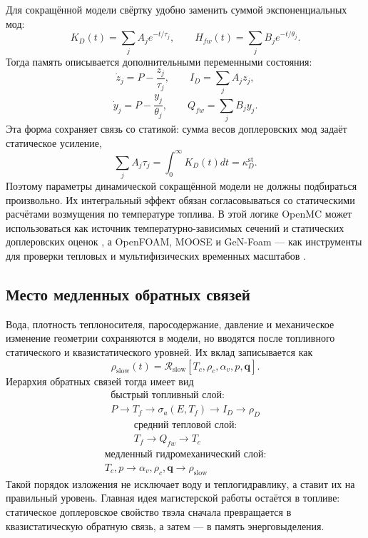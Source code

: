 \documentclass[12pt]{article}
\begin{document}
Для сокращённой модели свёртку удобно заменить суммой экспоненциальных мод:
\[
K_D(t)=\sum_jA_je^{-t/\tau_j},
\qquad
H_{fw}(t)=\sum_jB_je^{-t/\theta_j}.
\]
Тогда память описывается дополнительными переменными состояния:
\[
\dot z_j=P-\frac{z_j}{\tau_j},
\qquad
I_D=\sum_jA_jz_j,
\]
\[
\dot y_j=P-\frac{y_j}{\theta_j},
\qquad
Q_{fw}=\sum_jB_jy_j.
\]
Эта форма сохраняет связь со статикой: сумма весов доплеровских мод задаёт статическое усиление,
\[
\sum_jA_j\tau_j
=
\int_0^\infty K_D(t)dt
=
\kappa_D^{\mathrm{st}}.
\]
Поэтому параметры динамической сокращённой модели не должны подбираться произвольно. Их интегральный эффект обязан согласовываться со статическими расчётами возмущения по температуре топлива. В этой логике OpenMC может использоваться как источник температурно-зависимых сечений и статических доплеровских оценок \cite{OpenMCCrossSections}, а OpenFOAM, MOOSE и GeN-Foam --- как инструменты для проверки тепловых и мультифизических временных масштабов \cite{MOOSEHeatTransfer,OpenFOAMSolvers,GeNFoam2015}.

\subsection{Место медленных обратных связей}

Вода, плотность теплоносителя, паросодержание, давление и механическое изменение геометрии сохраняются в модели, но вводятся после топливного статического и квазистатического уровней. Их вклад записывается как
\[
\rho_{\mathrm{slow}}(t)
=
\mathcal R_{\mathrm{slow}}
[T_c,\rho_c,\alpha_v,p,\mathbf q].
\]
Иерархия обратных связей тогда имеет вид
\[
\boxed{
\begin{gathered}
\text{быстрый топливный слой:}\\
P\rightarrow T_f\rightarrow\sigma_a(E,T_f)\rightarrow I_D\rightarrow\rho_D
\end{gathered}
}
\]
\[
\boxed{
\begin{gathered}
\text{средний тепловой слой:}\\
T_f\rightarrow Q_{fw}\rightarrow T_c
\end{gathered}
}
\]
\[
\boxed{
\begin{gathered}
\text{медленный гидромеханический слой:}\\
T_c,p\rightarrow \alpha_v,\rho_c,\mathbf q\rightarrow \rho_{\mathrm{slow}}
\end{gathered}
}
\]
Такой порядок изложения не исключает воду и теплогидравлику, а ставит их на правильный уровень. Главная идея магистерской работы остаётся в топливе: статическое доплеровское свойство твэла сначала превращается в квазистатическую обратную связь, а затем --- в память энерговыделения.
\end{document}
